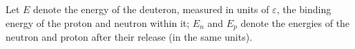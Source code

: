 Let $E$ denote the energy of the deuteron, measured in units of $\varepsilon$, the binding energy of the proton and neutron within it; $E_n$ and $E_p$ denote the energies of the neutron and proton after their release (in the same units).
